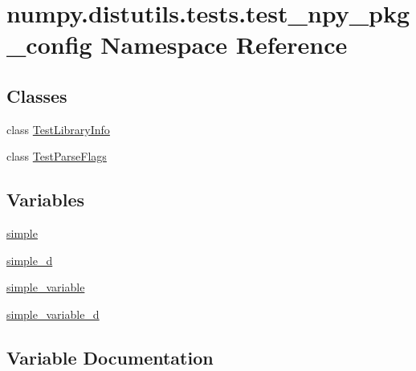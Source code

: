 \hypertarget{namespacenumpy_1_1distutils_1_1tests_1_1test__npy__pkg__config}{}\section{numpy.\+distutils.\+tests.\+test\+\_\+npy\+\_\+pkg\+\_\+config Namespace Reference}
\label{namespacenumpy_1_1distutils_1_1tests_1_1test__npy__pkg__config}
\subsection*{Classes}
\begin{DoxyCompactItemize}
\item 
class \hyperlink{classnumpy_1_1distutils_1_1tests_1_1test__npy__pkg__config_1_1TestLibraryInfo}{Test\+Library\+Info}
\item 
class \hyperlink{classnumpy_1_1distutils_1_1tests_1_1test__npy__pkg__config_1_1TestParseFlags}{Test\+Parse\+Flags}
\end{DoxyCompactItemize}
\subsection*{Variables}
\begin{DoxyCompactItemize}
\item 
\hyperlink{namespacenumpy_1_1distutils_1_1tests_1_1test__npy__pkg__config_a3fb54bbac5c287676b9eb3a6e5127d37}{simple}
\item 
\hyperlink{namespacenumpy_1_1distutils_1_1tests_1_1test__npy__pkg__config_ac3570127e609d9a4f1b7b35b7ada0192}{simple\+\_\+d}
\item 
\hyperlink{namespacenumpy_1_1distutils_1_1tests_1_1test__npy__pkg__config_a5829d48cc0685814133bfe7838ec24d7}{simple\+\_\+variable}
\item 
\hyperlink{namespacenumpy_1_1distutils_1_1tests_1_1test__npy__pkg__config_a03b89857f4160f44392652306af9d3bc}{simple\+\_\+variable\+\_\+d}
\end{DoxyCompactItemize}


\subsection{Variable Documentation}
\mbox{\label{namespacenumpy_1_1distutils_1_1tests_1_1test__npy__pkg__config_a3fb54bbac5c287676b9eb3a6e5127d37}} 
